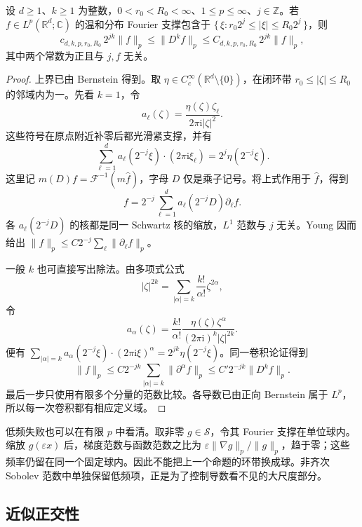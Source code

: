 \begin{proposition}[环带上的导数尺度]\label{b2:prop:19-annular-bernstein}
设 \(d\geq1\)、\(k\geq1\) 为整数，\(0<r_0<R_0<\infty\)、\(1\leq p\leq\infty\)、\(j\in\mathbb Z\)。若 \(f\in L^p(\mathbb R^d;\mathbb C)\) 的温和分布 Fourier 支撑包含于
\(\{\,\xi:r_0 2^j\leq|\xi|\leq R_0 2^j\,\}\)，则
\[
 c_{d,k,p,r_0,R_0}\,2^{jk}\|f\|_p
 \leq\|D^kf\|_p
 \leq C_{d,k,p,r_0,R_0}\,2^{jk}\|f\|_p,
\]
其中两个常数为正且与 \(j,f\) 无关。
\end{proposition}
\begin{proof}
上界已由 Bernstein 得到。取 \(\eta\in C_c^\infty(\mathbb R^d\setminus\{0\})\)，在闭环带 \(r_0\leq|\zeta|\leq R_0\) 的邻域内为一。先看 \(k=1\)，令
\[
 a_\ell(\zeta)=\frac{\eta(\zeta)\zeta_\ell}
                         {2\pi\mathrm i|\zeta|^2}.
\]
这些符号在原点附近补零后都光滑紧支撑，并有
\[
 \sum_{\ell=1}^d a_\ell(2^{-j}\xi)
                       \cdot(2\pi\mathrm i\xi_\ell)
 =2^j\eta(2^{-j}\xi).
\]
这里记 \(m(D)f=\mathcal F^{-1}(m\widehat f)\)，字母 \(D\) 仅是乘子记号。将上式作用于 \(\widehat f\)，得到
\[
 f=2^{-j}\sum_{\ell=1}^d a_\ell(2^{-j}D)\partial_\ell f.
\]
各 \(a_\ell(2^{-j}D)\) 的核都是同一 Schwartz 核的缩放，\(L^1\) 范数与 \(j\) 无关。Young 因而给出 \(\|f\|_p\leq C2^{-j}\sum_\ell\|\partial_\ell f\|_p\)。

一般 \(k\) 也可直接写出除法。由多项式公式
\[
 |\zeta|^{2k}
 =\sum_{|\alpha|=k}\frac{k!}{\alpha!}\zeta^{2\alpha},
\]
令
\[
 a_\alpha(\zeta)=\frac{k!}{\alpha!}
 \frac{\eta(\zeta)\zeta^\alpha}{(2\pi\mathrm i)^k|\zeta|^{2k}}.
\]
便有 \(\sum_{|\alpha|=k}a_\alpha(2^{-j}\xi)\cdot(2\pi\mathrm i\xi)^\alpha=2^{jk}\eta(2^{-j}\xi)\)。同一卷积论证得到
\[
 \|f\|_p\leq C2^{-jk}\sum_{|\alpha|=k}\|\partial^\alpha f\|_p
 \leq C'2^{-jk}\|D^kf\|_p.
\]
最后一步只使用有限多个分量的范数比较。各导数已由正向 Bernstein 属于 \(L^p\)，所以每一次卷积都有相应定义域。
\end{proof}

低频失败也可以在有限 \(p\) 中看清。取非零 \(g\in\mathcal S\)，令其 Fourier 支撑在单位球内。缩放 \(g(\varepsilon x)\) 后，梯度范数与函数范数之比为 \(\varepsilon\|\nabla g\|_p/\|g\|_p\)，趋于零；这些频率仍留在同一个固定球内。因此不能把上一个命题的环带换成球。非齐次 Sobolev 范数中单独保留低频项，正是为了控制导数看不见的大尺度部分。

\subsection{近似正交性}
\label{b2:subsec:190304}

